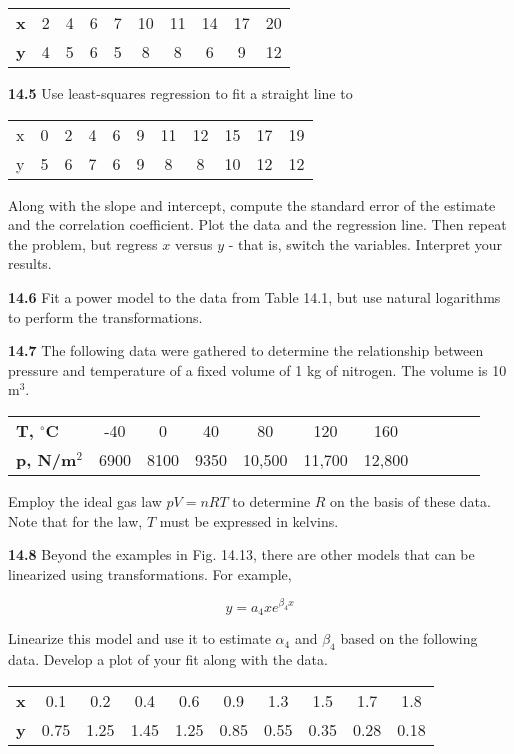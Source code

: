 \documentclass[../main.tex]{subfiles}
\begin{document}
\begin{multicols}{2}
	\noindent \begin{tabular}{c c c c c c c c c c }
	 	\textbf{x} & 2 & 4 & 6 & 7 & 10 & 11 & 		14 & 		17 & 		20 \\
	  	\textbf{y} & 4 & 5 & 6 & 5 & 8 & 8 & 6 & 9 & 		12
	\end{tabular}

	\noindent\textbf{14.5} Use least-squares regression to fit a straight line to

	\noindent \begin{tabular}{c c c c c c c c c c c  }
 		x & 0 & 2 & 4 & 6 & 9 & 11 & 12 & 15 & 17 & 19 \\
 		y & 5 & 6 & 7 & 6 & 9 & 8 & 8 & 10 & 12 & 12
   	\end{tabular}

   	\noindent Along with the slope and intercept, compute the standard
	   error of the estimate and the correlation coefficient. Plot the
	   data and the regression line. Then repeat the problem, but
	   regress $x$ versus $y$ - that is, switch the variables. Interpret
	   your results.

	\noindent\textbf{14.6} Fit a power model to the data from Table 14.1, but use
	natural logarithms to perform the transformations.

	\noindent\textbf{14.7} The following data were gathered to determine the
	relationship between pressure and temperature of a fixed
	volume of 1 kg of nitrogen. The volume is 10 m$^3$.

	\noindent \begin{tabular}{l c c c c c c c c c c  }
		\textbf{T, $^\circ$C} & -40 & 0 & 40 & 80 & 120 & 160 \\
		\textbf{p, N/m$^2$} & 6900 & 8100 & 9350 & 10,500 & 11,700 & 12,800
  	\end{tabular}

	\noindent Employ the ideal gas law $pV = nRT$ to determine $R$ on the
	basis of these data. Note that for the law, $T$ must be expressed
	in kelvins.

	\noindent\textbf{14.8} Beyond the examples in Fig. 14.13, there are other
	models that can be linearized using transformations. For
	example,

	$$y = a_4 x e^{\beta_4 x}$$

	\noindent Linearize this model and use it to estimate $\alpha_4$ and $\beta_4$ based
	on the following data. Develop a plot of your fit along with
	the data.

	\noindent \begin{tabular}{c c c c c c c c c c}
		\textbf{x} & 0.1 & 0.2 & 0.4 & 0.6 & 0.9 & 1.3 & 1.5 & 1.7 & 1.8 \\
		\textbf{y} & 0.75 & 1.25 & 1.45 & 1.25 & 0.85 & 0.55 & 0.35 & 0.28 & 0.18	
  	\end{tabular}


\end{multicols}
\end{document}
